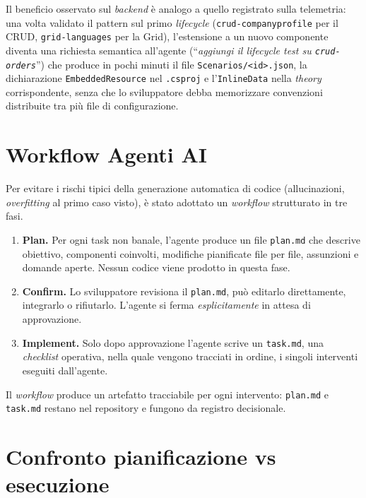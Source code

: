 Il beneficio osservato sul \emph{backend} è analogo a quello registrato sulla telemetria:
una volta validato il pattern sul primo \emph{lifecycle} (\texttt{crud-companyprofile} per
il CRUD, \texttt{grid-languages} per la Grid), l'estensione a un nuovo componente diventa
una richiesta semantica all'agente (``\emph{aggiungi il \emph{lifecycle test} su
\texttt{crud-orders}}'') che produce in pochi minuti il file \texttt{Scenarios/<id>.json},
la dichiarazione \texttt{EmbeddedResource} nel \texttt{.csproj} e l'\texttt{InlineData}
nella \emph{theory} corrispondente, senza che lo sviluppatore debba memorizzare
convenzioni distribuite tra più file di configurazione.

\section{Workflow Agenti AI}
\label{sec:workflow-plan}

Per evitare i rischi tipici della generazione automatica di codice (allucinazioni, \emph{overfitting} 
al primo caso visto), è stato adottato un \emph{workflow} strutturato in tre fasi.

\begin{enumerate}
    \item \textbf{Plan.} Per ogni task non banale, l'agente produce un file
        \texttt{plan.md} che descrive
        obiettivo, componenti coinvolti, modifiche pianificate file per file, assunzioni e
        domande aperte. Nessun codice viene prodotto in questa fase.
    \item \textbf{Confirm.} Lo sviluppatore revisiona il \texttt{plan.md}, può editarlo
        direttamente, integrarlo o rifiutarlo. L'agente si ferma \emph{esplicitamente} in
        attesa di approvazione.
    \item \textbf{Implement.} Solo dopo approvazione l'agente scrive un \texttt{task.md}, una
        \emph{checklist} operativa, nella quale vengono tracciati in ordine, i singoli interventi 
        eseguiti dall'agente.
\end{enumerate}

Il \emph{workflow} produce un artefatto tracciabile per ogni intervento: \texttt{plan.md} e
\texttt{task.md} restano nel repository e fungono da registro decisionale.

\section{Confronto pianificazione vs esecuzione}

